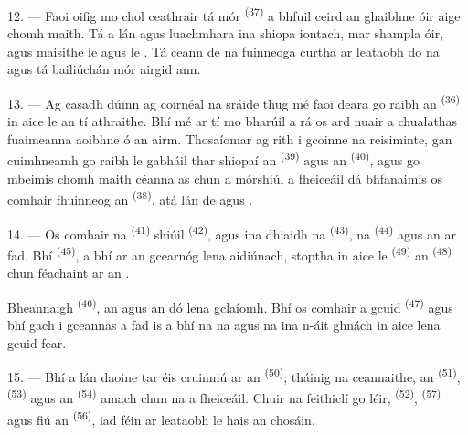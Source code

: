 12. --- Faoi oifig mo chol ceathrair tá  mór
\textsuperscript{(37)} a bhfuil ceird an ghaibhne óir aige chomh maith. Tá a lán
 agus  luachmhara
ina shiopa iontach, mar shampla   óir,
 agus  maisithe le  agus
le . Tá ceann de na fuinneoga curtha ar leataobh do na  agus tá bailiúchán mór  airgid ann.

13. --- Ag casadh dúinn ag coirnéal na sráide thug mé faoi deara go raibh an
 \textsuperscript{(36)} in aice le  an tí athraithe. Bhí
mé ar tí mo bharúil a rá os ard nuair a chualathas fuaimeanna aoibhne ó 
an airm. Thosaíomar ag rith i gcoinne na reisiminte, gan cuimhneamh go raibh
 le gabháil thar shiopaí an  \textsuperscript{(39)}
agus an  \textsuperscript{(40)}, agus go mbeimis chomh
maith céanna as chun a mórshiúl a fheiceáil dá bhfanaimis os comhair fhuinneog an
 \textsuperscript{(38)}, atá lán de 
 agus .

\VUsaut{3.0mm}

14. --- Os comhair na  \textsuperscript{(41)} shiúil  \textsuperscript{(42)}, agus ina dhiaidh na 
\textsuperscript{(43)}, na  \textsuperscript{(44)} agus an
 ar fad. Bhí  \textsuperscript{(45)}, a bhí
ar an gcearnóg lena aidiúnach, stoptha in aice le 
\textsuperscript{(49)} an  \textsuperscript{(48)} chun féachaint ar an
.

Bheannaigh  \textsuperscript{(46)}, an 
agus an  dó lena gclaíomh. Bhí  os comhair a
gcuid  \textsuperscript{(47)} agus bhí gach  i gceannas
a  fad is a bhí na  na
 agus na  ina n-áit ghnách in aice lena
gcuid fear.

15. --- Bhí a lán daoine tar éis cruinniú ar an 
\textsuperscript{(50)}; tháinig na ceannaithe, an 
\textsuperscript{(51)},  \textsuperscript{(53)} agus an
 \textsuperscript{(54)} amach chun na  a
fheiceáil. Chuir na feithiclí go léir,  \textsuperscript{(52)},
 \textsuperscript{(57)} agus fiú an  \textsuperscript{(56)}, iad féin ar leataobh le hais an chosáin.

